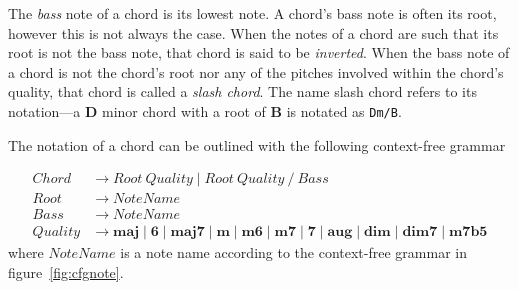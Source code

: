 The \textit{bass} note of a chord is its lowest note. A chord's bass note is often its root, however this is not always the case. When the notes of a chord are such that its root is not the bass note, that chord is said to be \textit{inverted}. When the bass note of a chord is not the chord's root nor any of the pitches involved within the chord's quality, that chord is called a \textit{slash chord}. The name slash chord refers to its notation---a \textbf{D} minor chord with a root of \textbf{B} is notated as \texttt{Dm/B}.

The notation of a chord can be outlined with the following context-free grammar

\begin{align*}
Chord &\to Root\ Quality \mid Root\ Quality\ \texttt{/} \ Bass \\
Root &\to NoteName \\
Bass &\to NoteName \\
Quality &\to \textbf{maj} \mid \textbf{6} \mid \textbf{maj7} \mid \textbf{m} \mid \textbf{m6} \mid \textbf{m7} \mid \textbf{7} \mid \textbf{aug} \mid \textbf{dim} \mid \textbf{dim7} \mid \textbf{m7b5}
\end{align*}
where $NoteName$ is a note name according to the context-free grammar in figure~\ref{fig:cfgnote}.